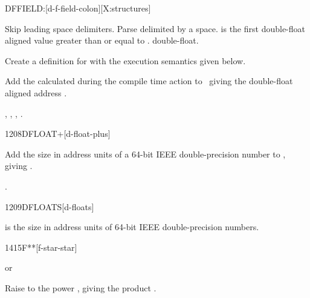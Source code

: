 
\begin{worddef}{}{DFFIELD:}[d-f-field-colon][X:structures]
\item {}

	Skip leading space delimiters. Parse  delimited by
	a space.  is the first double-float aligned value
	greater than or equal to .  
	double-float.

	Create a definition for  with the execution semantics
	given below.

\execute[name]
\cbstart{}
\cbend

	Add the  calculated during the compile time action to
\cbstart{}\cbend\ 
	giving the double-float aligned address
\cbstart{}.\cbend

\see {},
	,
	, \linebreak
	.
\end{worddef}


\begin{worddef}{1208}{DFLOAT+}[d-float-plus]
\item {}

	Add the size in address units of a 64-bit IEEE double-precision
	number to , giving .

\see {}.
\end{worddef}


\begin{worddef}{1209}{DFLOATS}[d-floats]
\item {}

	 is the size in address units of  64-bit
	IEEE double-precision numbers.
\end{worddef}


\begin{worddef}{1415}{F**}[f-star-star]
\item {} or

	Raise  to the power , giving the product
	.
\end{worddef}


